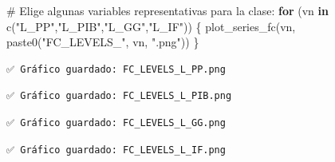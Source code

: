 \documentclass[
  spanish,
  letterpaper,
  DIV=11,
  numbers=noendperiod]{scrartcl}
\newenvironment{Shaded}{\begin{snugshade}}{\end{snugshade}}
\newcommand{\CommentTok}[1]{\textcolor[rgb]{0.37,0.37,0.37}{#1}}
\newcommand{\ControlFlowTok}[1]{\textcolor[rgb]{0.00,0.23,0.31}{\textbf{#1}}}
\newcommand{\FunctionTok}[1]{\textcolor[rgb]{0.28,0.35,0.67}{#1}}
\newcommand{\NormalTok}[1]{\textcolor[rgb]{0.00,0.23,0.31}{#1}}
\newcommand{\StringTok}[1]{\textcolor[rgb]{0.13,0.47,0.30}{#1}}
\begin{document}
\begin{Shaded}
\begin{Highlighting}[]
\CommentTok{\# Elige algunas variables representativas para la clase:}
\ControlFlowTok{for}\NormalTok{ (vn }\ControlFlowTok{in} \FunctionTok{c}\NormalTok{(}\StringTok{"L\_PP"}\NormalTok{,}\StringTok{"L\_PIB"}\NormalTok{,}\StringTok{"L\_GG"}\NormalTok{,}\StringTok{"L\_IF"}\NormalTok{)) \{}
  \FunctionTok{plot\_series\_fc}\NormalTok{(vn, }\FunctionTok{paste0}\NormalTok{(}\StringTok{"FC\_LEVELS\_"}\NormalTok{, vn, }\StringTok{".png"}\NormalTok{))}
\NormalTok{\}}
\end{Highlighting}
\end{Shaded}

\begin{verbatim}
✅ Gráfico guardado: FC_LEVELS_L_PP.png 
\end{verbatim}

\begin{verbatim}
✅ Gráfico guardado: FC_LEVELS_L_PIB.png 
\end{verbatim}

\begin{verbatim}
✅ Gráfico guardado: FC_LEVELS_L_GG.png 
\end{verbatim}

\begin{verbatim}
✅ Gráfico guardado: FC_LEVELS_L_IF.png 
\end{verbatim}
\end{document}
